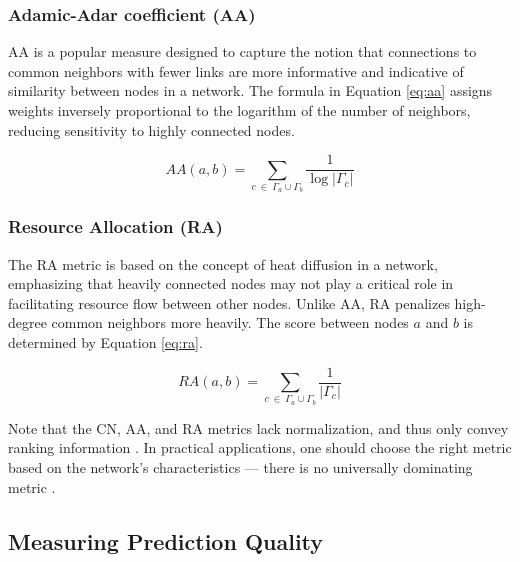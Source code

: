 \subsubsection{Adamic-Adar coefficient (AA)}

AA \cite{adamic2003friends} is a popular measure designed to capture the notion that connections to common neighbors with fewer links are more informative and indicative of similarity between nodes in a network. The formula in Equation \ref{eq:aa} assigns weights inversely proportional to the logarithm of the number of neighbors, reducing sensitivity to highly connected nodes.

\begin{equation}
\label{eq:aa}
  AA(a, b) = \sum_{c\ \in\ \Gamma_a \cup \Gamma_b} \frac{1}{\log{|\Gamma_c|}}
\end{equation}


\subsubsection{Resource Allocation (RA)}

The RA metric \cite{zhou2010solving} is based on the concept of heat diffusion in a network, emphasizing that heavily connected nodes may not play a critical role in facilitating resource flow between other nodes. Unlike AA, RA penalizes high-degree common neighbors more heavily. The score between nodes $a$ and $b$ is determined by Equation \ref{eq:ra}.

\begin{equation}
\label{eq:ra}
  RA(a, b) = \sum_{c\ \in\ \Gamma_a \cup \Gamma_b} \frac{1}{|\Gamma_c|}
\end{equation}

Note that the CN, AA, and RA metrics lack normalization, and thus only convey ranking information \cite{wang2014link}. In practical applications, one should choose the right metric based on the network's characteristics --- there is no universally dominating metric \cite{zhou2021progresses, ghasemian2020stacking, wang2014link, liben2003link}.




\subsection{Measuring Prediction Quality}


